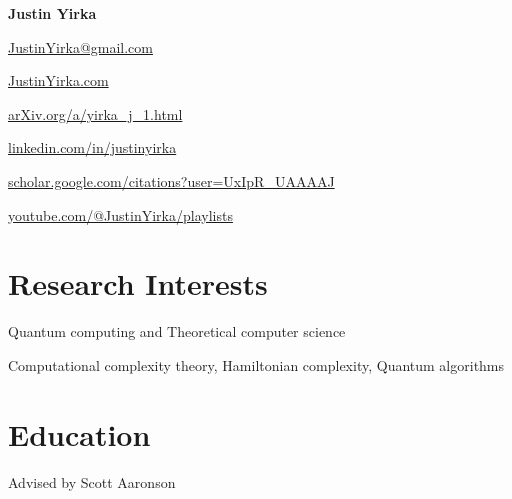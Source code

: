 \documentclass[11pt,letterpaper,serif]{moderncv}
\begin{document}
\pagestyle{normal}


\thispagestyle{firstpage}

\begin{center}
	{\LARGE\textbf{Justin Yirka}}

	\medskip{}

	\href{mailto:justinyirka@gmail.com}{JustinYirka@gmail.com}

	\medskip{}

	\href{https://www.justinyirka.com}{JustinYirka.com}


	\href{https://arxiv.org/a/yirka_j_1.html}{arXiv.org/a/yirka\_j\_1.html}

	\faLinkedin{} \href{https://www.linkedin.com/in/justinyirka/}{linkedin.com/in/justinyirka}

	\faGraduationCap{} \href{https://scholar.google.com/citations?user=UxIpR_UAAAAJ}{scholar.google.com/citations?user=UxIpR\_UAAAAJ}

	\faYoutube{}
	\href{https://www.youtube.com/playlist?list=PLHxZKg_X23Knp1fhJJI2u9HZP39uhbr7O}{youtube.com/@JustinYirka/playlists}
\end{center}


\setlength{\parskip}{0em}

\section{Research Interests}
Quantum computing and Theoretical computer science

\qquad Computational complexity theory, Hamiltonian complexity, Quantum algorithms


\section{Education}


{
	\normalsize
	\begin{adjustwidth}{.25in}{}
		Advised by Scott Aaronson 
	\end{adjustwidth}
}
\end{document}
